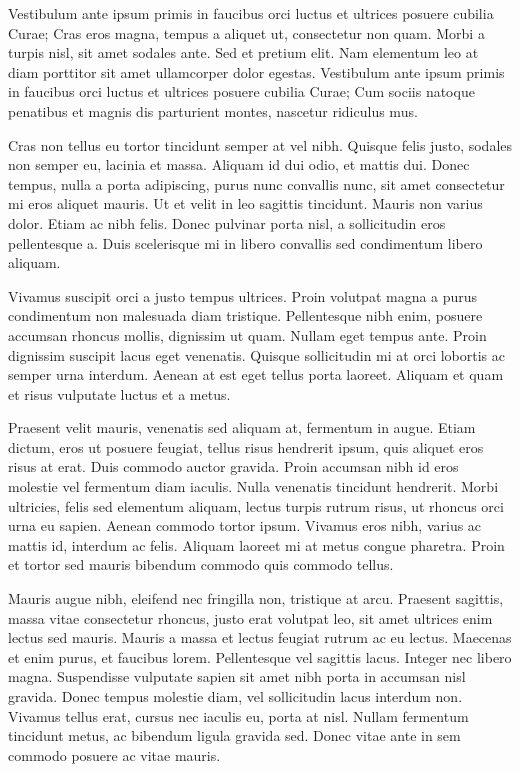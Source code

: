 Vestibulum ante ipsum primis in faucibus orci luctus et ultrices posuere
cubilia Curae; Cras eros magna, tempus a aliquet ut, consectetur non
quam. Morbi a turpis nisl, sit amet sodales ante. Sed et pretium elit.
Nam elementum leo at diam porttitor sit amet ullamcorper dolor egestas.
Vestibulum ante ipsum primis in faucibus orci luctus et ultrices posuere
cubilia Curae; Cum sociis natoque penatibus et magnis dis parturient
montes, nascetur ridiculus mus.

Cras non tellus eu tortor tincidunt semper at vel nibh. Quisque felis
justo, sodales non semper eu, lacinia et massa. Aliquam id dui odio,
et mattis dui. Donec tempus, nulla a porta adipiscing, purus nunc
convallis nunc, sit amet consectetur mi eros aliquet mauris. Ut et
velit in leo sagittis tincidunt. Mauris non varius dolor. Etiam ac
nibh felis. Donec pulvinar porta nisl, a sollicitudin eros pellentesque
a. Duis scelerisque mi in libero convallis sed condimentum libero
aliquam.

Vivamus suscipit orci a justo tempus ultrices. Proin volutpat magna
a purus condimentum non malesuada diam tristique. Pellentesque nibh
enim, posuere accumsan rhoncus mollis, dignissim ut quam. Nullam eget
tempus ante. Proin dignissim suscipit lacus eget venenatis. Quisque
sollicitudin mi at orci lobortis ac semper urna interdum. Aenean at
est eget tellus porta laoreet. Aliquam et quam et risus vulputate
luctus et a metus.

Praesent velit mauris, venenatis sed aliquam at, fermentum in augue.
Etiam dictum, eros ut posuere feugiat, tellus risus hendrerit ipsum,
quis aliquet eros risus at erat. Duis commodo auctor gravida. Proin
accumsan nibh id eros molestie vel fermentum diam iaculis. Nulla venenatis
tincidunt hendrerit. Morbi ultricies, felis sed elementum aliquam,
lectus turpis rutrum risus, ut rhoncus orci urna eu sapien. Aenean
commodo tortor ipsum. Vivamus eros nibh, varius ac mattis id, interdum
ac felis. Aliquam laoreet mi at metus congue pharetra. Proin et tortor
sed mauris bibendum commodo quis commodo tellus.

Mauris augue nibh, eleifend nec fringilla non, tristique at arcu.
Praesent sagittis, massa vitae consectetur rhoncus, justo erat volutpat
leo, sit amet ultrices enim lectus sed mauris. Mauris a massa et lectus
feugiat rutrum ac eu lectus. Maecenas et enim purus, et faucibus lorem.
Pellentesque vel sagittis lacus. Integer nec libero magna. Suspendisse
vulputate sapien sit amet nibh porta in accumsan nisl gravida. Donec
tempus molestie diam, vel sollicitudin lacus interdum non. Vivamus
tellus erat, cursus nec iaculis eu, porta at nisl. Nullam fermentum
tincidunt metus, ac bibendum ligula gravida sed. Donec vitae ante
in sem commodo posuere ac vitae mauris.

